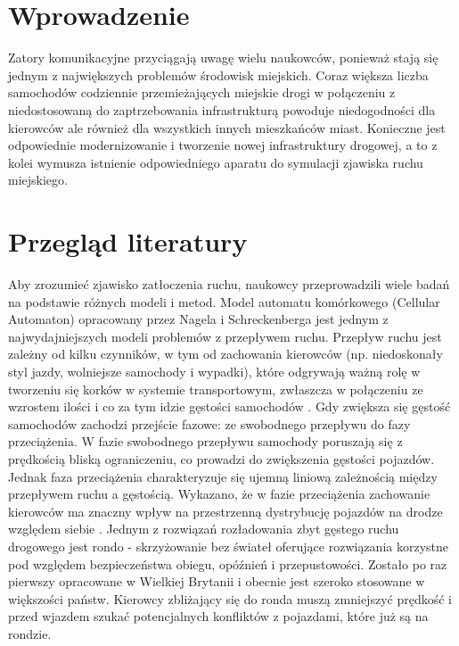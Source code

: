 \documentclass[a4paper,12pt]{article}
\begin{document}
\section{Wprowadzenie}

Zatory komunikacyjne przyciągają uwagę wielu naukowców, ponieważ stają się jednym z największych problemów środowisk miejskich. Coraz większa liczba samochodów codziennie przemieżających miejskie drogi w połączeniu z niedostosowaną do zaptrzebowania infrastrukturą powoduje niedogodności dla kierowców ale również dla wszystkich innych mieszkańców miast. Konieczne jest odpowiednie modernizowanie i tworzenie nowej infrastruktury drogowej, a to z kolei wymusza istnienie odpowiedniego aparatu do symulacji zjawiska ruchu miejskiego.
		
\section{Przegląd literatury}

Aby zrozumieć zjawisko zatłoczenia ruchu, naukowcy przeprowadzili wiele badań na podstawie różnych modeli i metod. Model automatu komórkowego (Cellular Automaton) opracowany przez Nagela i Schreckenberga \cite{nagel1992cellular} jest jednym z najwydajniejszych modeli problemów z przepływem ruchu.
Przepływ ruchu jest zależny od kilku czynników, w tym od zachowania kierowców (np. niedoskonały styl jazdy, wolniejsze samochody i wypadki), które odgrywają ważną rolę w tworzeniu się korków w systemie transportowym, zwłaszcza w połączeniu ze wzrostem ilości i co za tym idzie gęstości samochodów \cite{chowdhury2000statistical}. Gdy zwiększa się gęstość samochodów zachodzi przejście fazowe: ze swobodnego przepływu do fazy przeciążenia. W fazie swobodnego przepływu samochody poruszają się z prędkością bliską ograniczeniu, co prowadzi do zwiększenia gęstości pojazdów. Jednak faza przeciążenia charakteryzuje się ujemną liniową zależnością między przepływem ruchu a gęstością. Wykazano, że w fazie przeciążenia zachowanie kierowców ma znaczny wpływ na przestrzenną dystrybucję pojazdów na drodze
względem siebie \cite{jarai2012earthquake}.
Jednym z rozwiązań rozładowania zbyt gęstego ruchu drogowego jest rondo - skrzyżowanie bez świateł oferujące rozwiązania
korzystne pod względem bezpieczeństwa obiegu, opóźnień i przepustowości. Zostało po raz pierwszy opracowane w Wielkiej Brytanii i obecnie jest szeroko stosowane w
większości państw. Kierowcy zbliżający się do ronda muszą zmniejszyć prędkość i przed wjazdem szukać potencjalnych konfliktów z pojazdami, które już są na rondzie.
\end{document}
